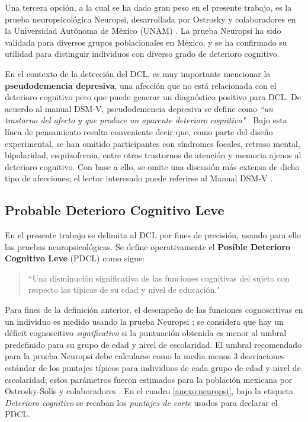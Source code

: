 \documentclass[12pt,letterpaper]{book}
\begin{document}

Una tercera opción, a la cual se ha dado gran peso en el presente trabajo, es la prueba neuropsicológica Neuropsi, desarrollada por Ostrosky y colaboradores en la Universidad Autónoma de México (UNAM) \cite{Ostrosky1999}.
%
La prueba Neuropsi ha sido validada para diversos grupos poblacionales en México, y se ha confirmado su utilidad para distinguir individuos con diverso grado de deterioro cognitivo.

En el contexto de la detección del DCL, es muy importante mencionar la \textbf{pseudodemencia depresiva}, una afección que no está relacionada con el deterioro cognitivo pero que puede generar un diagnóstico positivo para DCL.
%
De acuerdo al manual DSM-V, pseudodemencia depresiva se define como \textit{``un trastorno del afecto y que produce un aparente deterioro cognitivo"} \cite{DCM5}.
%
Bajo esta línea de pensamiento resulta conveniente decir que, como parte del diseño experimental, se han omitido participantes con síndromes focales, retraso mental, bipolaridad, esquizofrenia, entre otros trastornos de atención y memoria ajenos al deterioro cognitivo. 
%
Con base a ello, se omite una discusión más extensa de dicho tipo de afecciones; el lector interesado puede referirse al Manual DSM-V \cite{DCM5}.

\subsection{Probable Deterioro Cognitivo Leve}

En el presente trabajo se delimita al DCL por fines de precisión, usando para ello las pruebas neuropsicológicas. 
%
Se define operativamente el \textbf{Posible Deterioro Cognitivo Leve} (PDCL) como sigue:
\begin{quote}
``Una disminución significativa de las funciones cognitivas del sujeto con respecto las típicas de su edad y nivel de educación."
\end{quote}

Para fines de la definición anterior, el desempeño de las funciones cognoscitivas en un individuo es medido usando la prueba Neuropsi \cite{Ostrosky1999}; se considera que hay un déficit cognoscitivo \textit{significativo} si la puntuación obtenida es menor al umbral predefinido para su grupo de edad y nivel de escolaridad.
%
El umbral recomendado para la prueba Neuropsi debe calcularse como la media menos 3 desviaciones estándar de los puntajes típicos para individuos de cada grupo de edad y nivel de escolaridad; estos parámetros fueron estimados para la población mexicana por Ostrosky-Solís y colaboradores \cite{Ostrosky1999}.
%
En el cuadro \ref{anexo:neuropsi}, bajo la etiqueta \textit{Deterioro cognitivo} se recaban los \textit{puntajes de corte} usados para declarar el PDCL.
\end{document}
